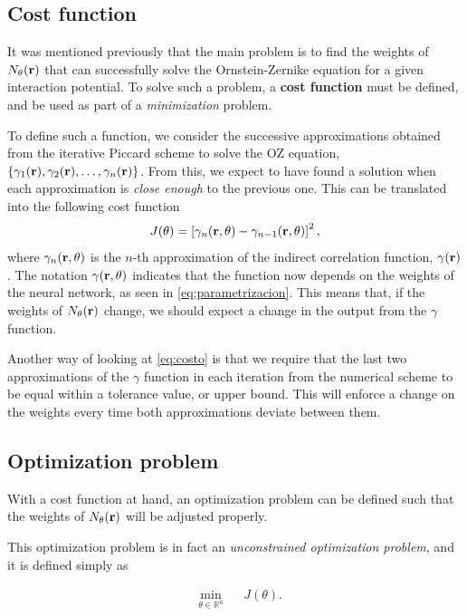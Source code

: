 \subsection{Cost function}
It was mentioned previously that the main problem is to find the weights of
$N_{\theta}(\mathbf{r})$ that can successfully solve the Ornstein-Zernike equation
for a given interaction potential.
To solve such a problem, a \textbf{cost function} must be defined, and be used as part of
a \emph{minimization} problem.

To define such a function, we consider the successive approximations obtained from the
iterative Piccard scheme to solve the OZ equation, $\left\{\gamma_1(\mathbf{r}), \gamma_2(\mathbf{r}), \dots, \gamma_n(\mathbf{r})\right\}$.
From this, we expect to have found a solution when each approximation
is \emph{close enough} to the previous one. This can be translated into the following
cost function
\begin{equation}
    J(\theta) = \left[\gamma_{n}(\mathbf{r}, \theta) - \gamma_{n-1}(\mathbf{r}, \theta) \right]^2 ,
    \label{eq:costo}
\end{equation}
where $\gamma_{n}(\mathbf{r}, \theta)$ is the $n$-th approximation of the indirect
correlation function, $\gamma(\mathbf{r})$.
The notation $\gamma(\mathbf{r}, \theta)$ indicates that the function now depends
on the weights of the neural network, as seen in \autoref{eq:parametrizacion}.
This means that, if the weights of $N_{\theta}(\mathbf{r})$ change, we should expect a change in the output
from the $\gamma$ function.

Another way of looking at \autoref{eq:costo} is that we require that the last 
two approximations of the $\gamma$ function in each iteration from the numerical scheme to 
be equal within a tolerance value, or upper bound. This will enforce a change on the 
weights every time both approximations deviate between them.

\subsection{Optimization problem}
With a cost function at hand, an optimization problem can be defined such that the
weights of $N_{\theta}(\mathbf{r})$ will be adjusted properly.

This optimization problem is in fact an \emph{unconstrained optimization problem},
and it is defined simply as

\begin{equation}
    \begin{aligned}
         & \underset{\theta \in \mathbb{R}^n}{\text{min}}
         & & J(\theta) .
    \end{aligned}
    \label{eq:optimizacion}
\end{equation}

